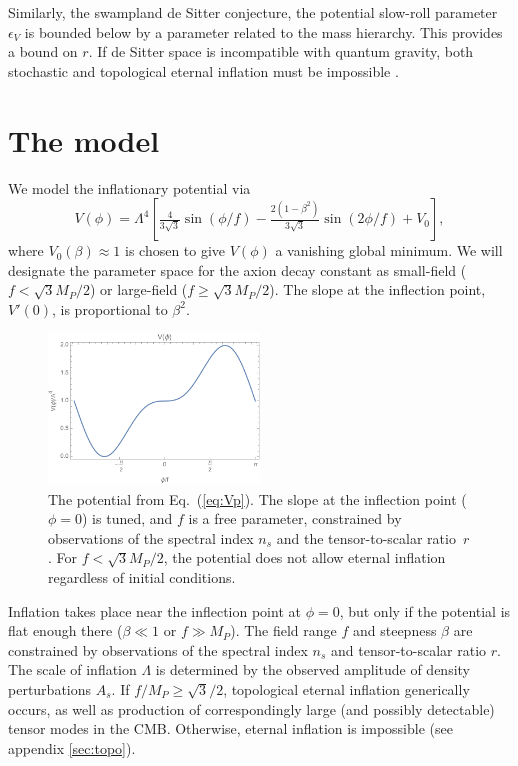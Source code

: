 \documentclass[aps,amsfonts,amsmath,prd,preprint,nofootinbib,superscriptaddress]{revtex4}
\newcommand{\Mp}{{M_{P}}}
\newcommand{\MMp}{{M_P^2}}
\newcommand{\beq}{\begin{equation}}
\newcommand{\eeq}{\end{equation}}
\begin{document}
Similarly, the swampland de Sitter conjecture, the potential slow-roll parameter $\epsilon_V$ is bounded below by a parameter related to the mass hierarchy.
This provides  \cite{Dias:2018ngv} a bound on $r$.  If de Sitter space is incompatible with quantum gravity, both stochastic and topological eternal inflation
must be impossible \cite{shandera,...}.  


\section{The model}
 We model the inflationary potential via
\beq
V(\phi) = \Lambda^4\left[\tfrac{4}{3\sqrt{3}}\sin(\phi/f) -\tfrac{2(1 - \beta^2)}{3\sqrt{3}} \sin(2\phi/f) + V_0  \right], \label{eq:Vp}
\eeq
where $V_0(\beta) \approx 1$ is chosen to give $V(\phi)$ a vanishing global minimum.
We will designate the parameter space for the axion decay constant as small-field ($f < \sqrt{3}\Mp/2$) or large-field ($f \geq \sqrt{3}\Mp/2$). %
The slope at the inflection point, $V'(0)$, is proportional to $\beta^2$.

\begin{figure}[!h]
  \centering
    \includegraphics[width=0.5\textwidth]{figures/V.pdf}
    \caption{The potential from Eq.~(\ref{eq:Vp}).  The slope at the inflection point ($\phi = 0$) is tuned, and $f$ is a free parameter, constrained by 
    observations of the spectral index $n_s$ and the tensor-to-scalar ratio~$r$.  For $f < \sqrt{3}\Mp/2$, the potential does not allow eternal inflation regardless of initial conditions.}
\end{figure}


Inflation takes place near the inflection point at $\phi = 0$, but only if the potential is flat enough there ($\beta \ll 1$ or $f \gg \Mp$).
The field range $f$ and steepness $\beta$ are constrained by observations of the spectral index $n_s$ and tensor-to-scalar 
ratio $r$.   The scale of inflation $\Lambda$ is determined by the observed amplitude of density perturbations $A_s$.
If $f/\Mp \geq \sqrt{3}/2$, topological eternal inflation generically occurs, as well as production of correspondingly large (and possibly detectable) tensor modes in the CMB.   
 Otherwise, eternal inflation is impossible (see appendix \ref{sec:topo}).
\end{document}
